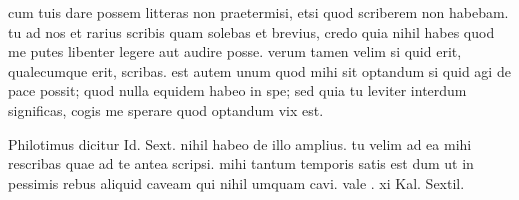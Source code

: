 


 cum tuis dare possem litteras non praetermisi, etsi quod scriberem non habebam. tu ad nos et rarius scribis quam solebas et brevius, credo quia nihil habes quod me putes libenter legere aut audire posse. verum tamen velim si quid erit, qualecumque erit, scribas. est autem unum quod mihi sit optandum si quid agi de pace possit; quod nulla equidem habeo in spe; sed quia tu leviter interdum significas, cogis me sperare quod optandum vix est.

 Philotimus dicitur Id. Sext. nihil habeo de illo amplius. tu velim ad ea mihi rescribas quae ad te antea scripsi. mihi tantum temporis satis est dum ut in pessimis rebus aliquid caveam qui nihil umquam cavi. vale . xi Kal. Sextil.
